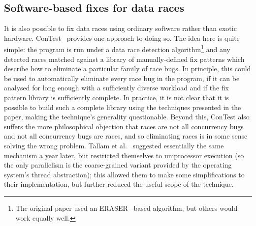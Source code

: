\subsection{Software-based fixes for data races}
It is also possible to fix data races using ordinary software rather
than exotic hardware.  ConTest~\cite{FFFKrena2007} provides one
approach to doing so.  The idea here is quite simple: the program is
run under a data race detection algorithm\footnote{The original paper
  used an ERASER~\cite{Savage1997}-based algorithm, but others would
  work equally well.} and any detected races matched against a library
of manually-defined fix patterns which describe how to eliminate a
particular family of race bugs.  In principle, this could be used to
automatically eliminate every race bug in the program, if it can be
analysed for long enough with a sufficiently diverse workload and if
the fix pattern library is sufficiently complete.  In practice, it is
not clear that it is possible to build such a complete library using
the techniques presented in the paper, making the technique's generality
questionable.  Beyond this, ConTest also suffers the more
philosophical objection that races are not all concurrency bugs and
not all concurrency bugs are races, and so eliminating races is in
some sense solving the wrong problem.  Tallam et al.~\cite{Tallam2008}
suggested essentially the same mechanism a year later, but restricted
themselves to uniprocessor execution (so the only parallelism is the
coarse-grained variant provided by the operating system's thread
abstraction); this allowed them to make some simplifications to their
implementation, but further reduced the useful scope of the technique.

